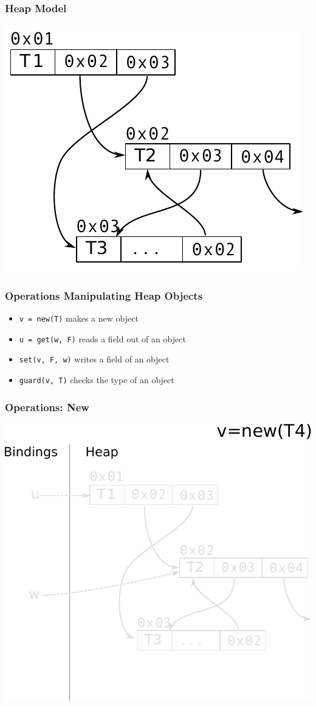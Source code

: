 \documentclass[utf8x]{beamer}
\begin{document}
\begin{frame}
  \frametitle{Heap Model}
  \includegraphics[scale=0.9]{figures/heap03}
\end{frame}

\begin{frame}
  \frametitle{Operations Manipulating Heap Objects}
  \begin{itemize}
      \item \texttt{v = new(T)} makes a new object
      \item \texttt{u = get(w, F)} reads a field out of an object
      \item \texttt{set(v, F, w)} writes a field of an object
      \item \texttt{guard(v, T)} checks the type of an object
  \end{itemize}
\end{frame}

\begin{frame}[plain]
  \frametitle{Operations: New}
  \includegraphics[scale=0.8]{figures/new01}
\end{frame}
\end{document}
